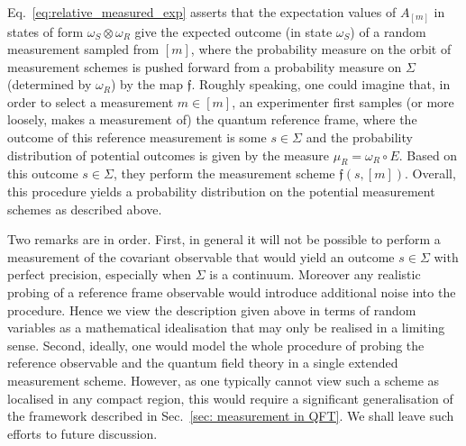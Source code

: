 \documentclass[sn-mathphys-num]{sn-jnl}%
\numberwithin{equation}{section}
\theoremstyle{thmstyleone}%
\theoremstyle{thmstyletwo}%
\theoremstyle{thmstylethree}%
\begin{document}
Eq.~\eqref{eq:relative_measured_exp} asserts that the
expectation values of $A_{[m]}$ in states of form $\omega_S\otimes\omega_R$ give the expected outcome (in state $\omega_S$) of a random measurement sampled from $[m]$, where the probability measure on the orbit of measurement schemes is pushed forward from a probability measure on $\Sigma$ (determined by $\omega_R$) by the map $\mathfrak{f}$. Roughly speaking, one could imagine that, in order to select a measurement $m\in[m]$, an experimenter first samples (or more loosely, makes a measurement of) the quantum reference frame, where the outcome of this reference measurement is some $s\in \Sigma$ and the probability distribution of potential outcomes is given by the measure $\mu_R=\omega_R\circ E$. Based on this outcome $s\in \Sigma$, they perform the measurement scheme $\mathfrak{f}(s,[m])$. Overall, this procedure yields a probability distribution on the potential measurement schemes as described above. 

Two remarks are in order. First, in general it will not be possible to perform a measurement of the covariant observable that would yield an outcome $s\in\Sigma$ with perfect precision, especially when $\Sigma$ is a continuum. Moreover any realistic probing of a reference frame observable would introduce additional noise into the procedure. Hence we view the description given above in terms of random variables as a mathematical idealisation that may only be realised in a limiting sense. Second, ideally, one would model the whole procedure of probing the reference observable and the quantum field theory in a single extended measurement scheme. However, as one typically cannot view such a scheme as localised in any compact region, this would require a significant generalisation of the framework described in Sec.\ \ref{sec: measurement in QFT}. We shall leave such efforts to future discussion.
\end{document}
